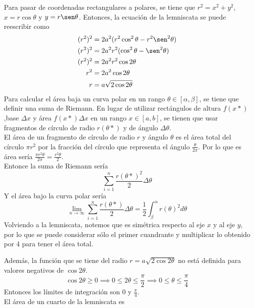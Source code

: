 \documentclass{article}
\begin{document}
\begin{enumerate}
{            \color{azul}
          	Para pasar de coordenadas rectangulares a polares, se tiene que
            $r^2 = x^2+y^2$, $x = r\cos \theta$ y  $y = r\sen \theta$.
            Entonces, la ecuación de la lemniscata se puede reescribir como
            \begin{align*}
                (r^2)^2 &= 2a^2(r^2 \cos^2 \theta - r^2 \sen^2 \theta)\\
                (r^2)^2 &= 2a^2r^2(\cos^2 \theta - \sen^2 \theta)\\
                (r^2)^2 &= 2a^2r^2\cos2\theta\\
                r^2 &= 2a^2\cos2\theta\\
                r &= a\sqrt{2\cos2\theta}
            \end{align*}
            Para calcular el área baja un curva polar en un rango
            $\theta \in[\alpha, \beta]$, se tiene que definir una
            suma de Riemann. En lugar de utilizar rectángulos de altura $f(x*)$
            ,base $\Delta x$ y área $f(x*)\Delta x$ en un rango $x\in[a, b]$,
            se tienen que usar fragmentos de círculo de radio $r(\theta *)$
            y de ángulo $\Delta \theta$.\\
            El área de un fragmento de círculo de radio $r$ y ángulo $\theta$
            es el área total del círculo $\pi r^2$ por la fracción del círculo
            que representa el ángulo $\frac{\theta}{2\pi}$. Por lo que es área
            sería $\frac{\pi r ^2\theta}{2\pi} = \frac{r^2\theta}{2}$.\\
            Entonce la suma de Riemann sería
            \[\sum_{i = 1}^n {\frac{r(\theta *)^2}{2}}\Delta \theta\]
            Y el área bajo la curva polar sería
            \[
                \lim_{n \to \infty}\sum_{i = 1}^n {\frac{r(\theta *)}{2}}\Delta \theta
                = \frac{1}{2}\int_\beta^\alpha {r(\theta)^2}d\theta
            \]
            Volviendo a la lemniscata, notemos que es simétrica respecto al eje
            $x$ y al eje $y$, por lo que se puede considerar sólo el primer
            cuandrante y multiplicar lo obtenido por 4 para tener el área
            total.

            Además, la función que se tiene del radio $r = a\sqrt{2\cos2\theta}$
            no está definida para valores negativos de $\cos2\theta$.
            \[
                \cos2\theta \geq 0 \implies 0 \leq 2\theta \leq \frac{\pi}{2}
                \implies 0 \leq \theta \leq \frac{\pi}{4}
            \]
            Entonces los límites de integración son 0 y $\frac{\pi}{4}$.\\
            El área de un cuarto de la lemniscata es

}
\end{enumerate}
\end{document}
